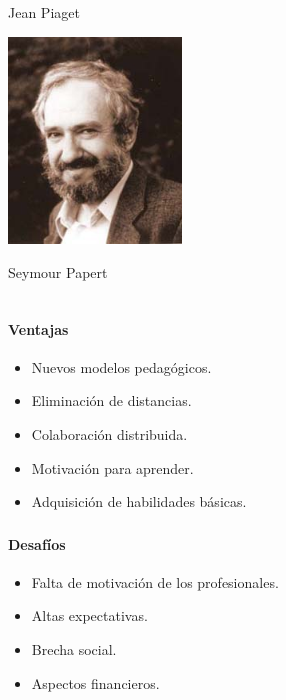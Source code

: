 \begin{frame}
\begin{columns}
\begin{overprint}
	\centering
	Jean Piaget    
    
     \includegraphics[width=\textwidth, height=5.5cm]{imagenes/construccionismo} 

	\centering
	Seymour Papert    
    
\end{overprint}


\end{columns}


\end{frame}

\begin{frame}
    \frametitle{\pagetitle}
    \framesubtitle{Ventajas}
    \begin{itemize}[<+->]
        \item Nuevos modelos pedagógicos.
        \item Eliminación de distancias.
        \item Colaboración distribuida.
        \item Motivación para aprender.
        \item Adquisición de habilidades básicas.
    \end{itemize}
\end{frame}

\begin{frame}
    \frametitle{\pagetitle}
    \framesubtitle{Desafíos}
	 \begin{itemize}[<+->]
        \item Falta de motivación de los profesionales.
        \item Altas expectativas.
        \item Brecha social.
        \item Aspectos financieros.
    \end{itemize}
\end{frame}
